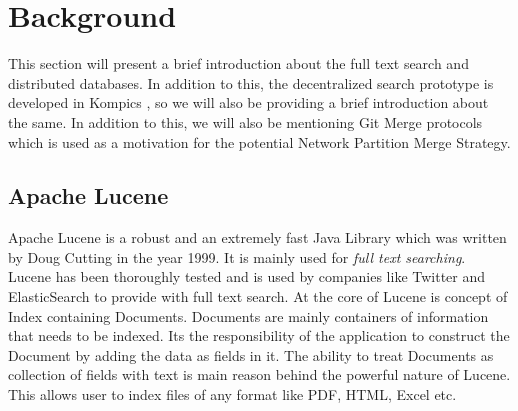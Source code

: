 \documentclass[12pt,a4paper,twoside,openright]{book}
\begin{document}
\chapter{Background}
\label{chap:background}

This section will present a brief introduction about the full text search and distributed databases. In addition to this, the decentralized search prototype is developed in Kompics \cite{kompics}, so we will also be providing a brief introduction about the same. In addition to this, we will also be mentioning Git Merge protocols which is used as a motivation for the potential Network Partition Merge Strategy.


\section{Apache Lucene}

Apache Lucene \cite{lucene} is a robust and an extremely fast Java Library which was written by Doug Cutting in the year 1999. It is mainly used for \textit{full text searching}. Lucene has been thoroughly tested and is used by companies like Twitter and ElasticSearch\cite{elasticsearch} to provide with full text search. At the core of Lucene is concept of Index containing Documents. Documents are mainly containers of information that needs to be indexed. Its the responsibility of the application to construct the Document by adding the data as fields in it. The ability to treat Documents as collection of fields with text is main reason behind the powerful nature of Lucene. This allows user to index files of any format like PDF, HTML, Excel etc. 
\end{document}
